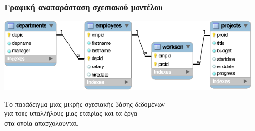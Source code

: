 \begin{frame}
\frametitle{Γραφική αναπαράσταση σχεσιακού μοντέλου}
\begin{minipage}{\wE}
  \includegraphics[scale=0.45]{../common/companyREL.pdf} \\
  \bigskip
  \par Το παράδειγμα μιας μικρής σχεσιακής βάσης δεδομένων \\ 
       για τους υπαλλήλους μιας εταιρίας και τα έργα \\
       στα οποία απασχολούνται.
\end{minipage}        
\end{frame}
